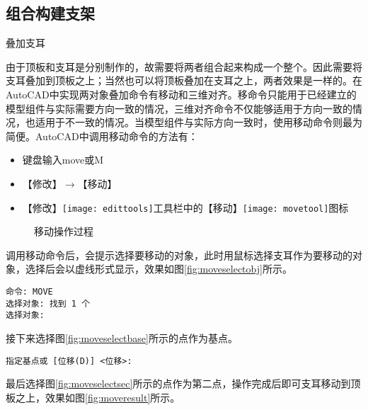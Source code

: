 \subsection{组合构建支架}
\begin{procedure}
\item 叠加支耳

由于顶板和支耳是分别制作的，故需要将两者组合起来构成一个整个。因此需要将支耳叠加到顶板之上；当然也可以将顶板叠加在支耳之上，两者效果是一样的。在AutoCAD中实现两对象叠加命令有移动和三维对齐。移命令只能用于已经建立的模型组件与实际需要方向一致的情况，三维对齐命令不仅能够适用于方向一致的情况，也适用于不一致的情况。当模型组件与实际方向一致时，使用移动命令则最为简便。AutoCAD中调用移动命令的方法有：
\begin{itemize}
\item 键盘输入move或M
\item 【修改】$\rightarrow $【移动】
\item 【修改】\texttt{[image: edittools]}工具栏中的【移动】\texttt{[image: movetool]}图标
\end{itemize}

\begin{figure}[htbp]
\centering
{}\hspace{20pt}
\hspace{20pt}
\hspace{20pt}
\caption{移动操作过程}
\end{figure}

调用移动命令后，会提示选择要移动的对象，此时用鼠标选择支耳作为要移动的对象，选择后会以虚线形式显示，效果如图\ref{fig:moveselectobj}所示。

\begin{lstlisting}
命令: MOVE
选择对象: 找到 1 个
选择对象:
\end{lstlisting}

接下来选择图\ref{fig:moveselectbase}所示的点作为基点。

\begin{lstlisting}
指定基点或 [位移(D)] <位移>:
\end{lstlisting}

最后选择图\ref{fig:moveselectsec}所示的点作为第二点，操作完成后即可支耳移动到顶板之上，效果如图\ref{fig:moveresult}所示。


\end{procedure}
